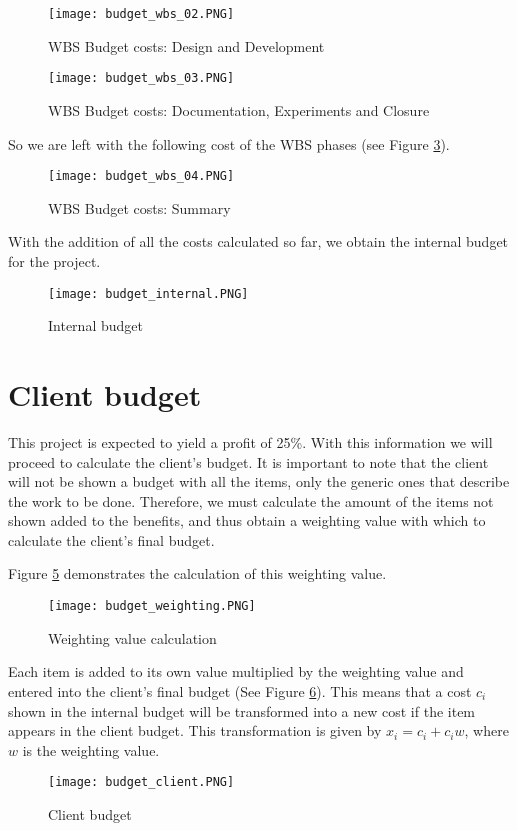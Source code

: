 \begin{figure}[H]
    \caption{WBS Budget costs: Design and Development}
    \label{fig-budget-wbs-02}
  \centering
  \texttt{[image: budget\_wbs\_02.PNG]}
\end{figure}


\begin{figure}[H]
    \caption{WBS Budget costs: Documentation, Experiments and Closure}
    \label{fig-budget-wbs-03}
  \centering
  \texttt{[image: budget\_wbs\_03.PNG]}
\end{figure}

So we are left with the following cost of the WBS phases (see Figure \ref{fig-budget-wbs-sum}).


\begin{figure}[H]
    \caption{WBS Budget costs: Summary}
    \label{fig-budget-wbs-sum}
  \centering
  \texttt{[image: budget\_wbs\_04.PNG]}
\end{figure}

With the addition of all the costs calculated so far, we obtain the internal budget for the project.


\begin{figure}[H]
    \caption{Internal budget}
    \label{fig-budget-internal}
  \centering
  \texttt{[image: budget\_internal.PNG]}
\end{figure}



\section{Client budget}


This project is expected to yield a profit of 25\%. With this information we will proceed to calculate the client's budget. It is important to note that the client will not be shown a budget with all the items, only the generic ones that describe the work to be done. Therefore, we must calculate the amount of the items not shown added to the benefits, and thus obtain a weighting value with which to calculate the client's final budget.

Figure \ref{fig-budget-weight} demonstrates the calculation of this weighting value.


\begin{figure}[H]
    \caption{Weighting value calculation}
    \label{fig-budget-weight}
  \centering
  \texttt{[image: budget\_weighting.PNG]}
\end{figure}

Each item is added to its own value multiplied by the weighting value and entered into the client's final budget (See Figure \ref{fig-budget-client}). This means that a cost $c_{i}$ shown in the internal budget will be transformed into a new cost if the item appears in the client budget. This transformation is given by $x_{i} = c_{i} + c_{i} w$, where $w$ is the weighting value. 


\begin{figure}[H]
    \caption{Client budget}
    \label{fig-budget-client}
  \centering
  \texttt{[image: budget\_client.PNG]}
\end{figure}




